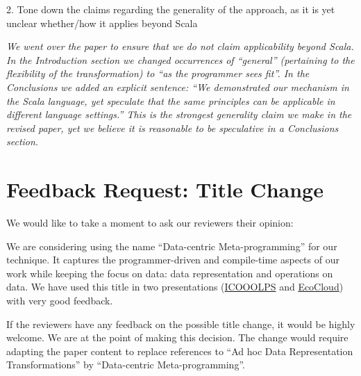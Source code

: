 \documentclass[9pt]{article}
\newenvironment{editorial-addr}
{ \color{OliveGreen} \framebox{{\bf REVISION}} }
{  }
\newenvironment{answer}
{ \em \framebox{{\bf AUTHOR RESPONSE}} }
{  }
\begin{document}
\begin{editorial-addr}
2. Tone down the claims regarding the generality of the approach, as it is yet unclear whether/how it applies beyond Scala
\end{editorial-addr}

\begin{answer}
We went over the paper to ensure that we do not claim applicability beyond Scala. In the Introduction section we changed occurrences of ``general'' (pertaining to the flexibility of the transformation) to ``as the programmer sees fit''. In the Conclusions we added an explicit sentence: ``We demonstrated our mechanism in the Scala language, yet speculate that the same principles can be applicable in different language settings.'' This is the strongest generality claim we make in the revised paper, yet we believe it is reasonable to be speculative in a Conclusions section.
\end{answer}





\section{Feedback Request: Title Change}

We would like to take a moment to ask our reviewers  their opinion:

We are considering using the name ``Data-centric Meta-programming'' for our technique. It captures the programmer-driven and compile-time aspects of our work while keeping the focus on data: data representation and operations on data. We have used this title in two presentations (\href{https://speakerdeck.com/vladureche/data-centric-metaprogramming-at-icooolps-2015}{ICOOOLPS} and \href{https://speakerdeck.com/vladureche/data-centric-metaprogramming-at-ecocloud-2015}{EcoCloud}) with very good feedback.

If the reviewers have any feedback on the possible title change, it would be highly welcome. We are at the point of making this decision. The change would require adapting the paper content to replace references to ``Ad hoc Data Representation Transformations'' by ``Data-centric Meta-programming''.
\end{document}
